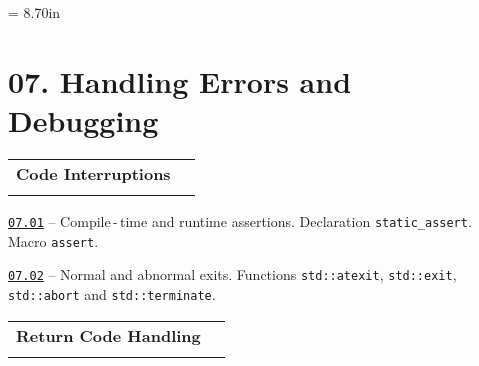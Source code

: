 \documentclass[a4paper,12pt]{article}
\renewenvironment{itemize}
{
    \begin{list}{\labelitemi}
    {
      \setlength{\topsep}{0pt}
      \setlength{\partopsep}{0pt}
      \setlength{\parskip}{0pt}
      \setlength{\itemsep}{0pt}
      \setlength{\parsep}{0pt}
      \setlength{\leftmargin}{14.5pt}
    }
}{\end{list}}
\begin{document}
\newpage\thispagestyle{empty}\pdfpageheight = 8.70in\enlargethispage{100in}

\section{07. Handling Errors and Debugging}

\begin{tabular}{!{\vrule width 1pt}L{3.7cm}!{\vrule width 1pt}L{15.3cm}!{\vrule width 0pt}} 


\textbf{Code Interruptions} & \\


\end{tabular}

\medskip\smallskip

\begin{itemize}

    \item \href{https://github.com/i-s-m-mipt/Education/blob/master/projects/examples/source/07.01.cpp}{\texttt{07.01}} -- Compile\,-\,time and runtime assertions. Declaration \lstinline{static_assert}. Macro \lstinline{assert}. 

    \smallskip

    \item \href{https://github.com/i-s-m-mipt/Education/blob/master/projects/examples/source/07.02.cpp}{\texttt{07.02}} -- Normal and abnormal exits. Functions \lstinline{std::atexit}, \lstinline{std::exit}, \lstinline{std::abort} and \lstinline{std::terminate}.

\end{itemize}

\bigskip\medskip

\begin{tabular}{!{\vrule width 1pt}L{4.4cm}!{\vrule width 1pt}L{14.6cm}!{\vrule width 0pt}} 


\textbf{Return Code Handling} & \\


\end{tabular}

\medskip\smallskip
\end{document}
